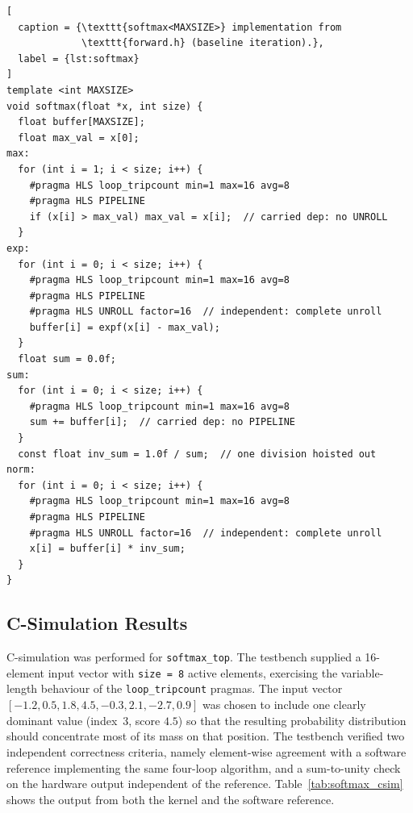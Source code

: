\begin{lstlisting}[
  caption = {\texttt{softmax<MAXSIZE>} implementation from
             \texttt{forward.h} (baseline iteration).},
  label = {lst:softmax}
]
template <int MAXSIZE>
void softmax(float *x, int size) {
  float buffer[MAXSIZE];
  float max_val = x[0];
max:
  for (int i = 1; i < size; i++) {
    #pragma HLS loop_tripcount min=1 max=16 avg=8
    #pragma HLS PIPELINE
    if (x[i] > max_val) max_val = x[i];  // carried dep: no UNROLL
  }
exp:
  for (int i = 0; i < size; i++) {
    #pragma HLS loop_tripcount min=1 max=16 avg=8
    #pragma HLS PIPELINE
    #pragma HLS UNROLL factor=16  // independent: complete unroll
    buffer[i] = expf(x[i] - max_val);
  }
  float sum = 0.0f;
sum:
  for (int i = 0; i < size; i++) {
    #pragma HLS loop_tripcount min=1 max=16 avg=8
    sum += buffer[i];  // carried dep: no PIPELINE
  }
  const float inv_sum = 1.0f / sum;  // one division hoisted out
norm:
  for (int i = 0; i < size; i++) {
    #pragma HLS loop_tripcount min=1 max=16 avg=8
    #pragma HLS PIPELINE
    #pragma HLS UNROLL factor=16  // independent: complete unroll
    x[i] = buffer[i] * inv_sum;
  }
}
\end{lstlisting}

\subsection{C-Simulation Results}
\label{subsec:softmax_csim}

C-simulation was performed for \texttt{softmax\_top}. The testbench
supplied a 16-element input vector with \texttt{size = 8} active
elements, exercising the variable-length behaviour of the
\texttt{loop\_tripcount} pragmas. The input vector
$[-1.2, 0.5, 1.8, 4.5, -0.3, 2.1, -2.7, 0.9]$ was chosen to include
one clearly dominant value (index~3, score $4.5$) so that the
resulting probability distribution should concentrate most of its mass
on that position. The testbench verified two independent correctness
criteria, namely element-wise agreement with a software reference
implementing the same four-loop algorithm, and a sum-to-unity check
on the hardware output independent of the reference. Table~\ref{tab:softmax_csim}
shows the output from both the kernel and the software reference.

